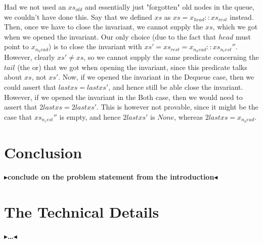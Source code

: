 \documentclass[twoside,11pt,openright]{report}
\newcommand{\todo}[1]{{\color[rgb]{.5,0,0}\textbf{$\blacktriangleright$#1$\blacktriangleleft$}}}
\begin{document}
Had we not used an $xs_{old}$ and essentially just "forgotten" old nodes in the queue, we couldn't have done this. Say that we defined $xs$ as $xs = x_{head} :: xs_{rest}$ instead. Then, once we have to close the invariant, we cannot supply the $xs$, which we got when we opened the invariant. Our only choice (due to the fact that $head$ must point to $x_{n_head}$) is to close the invariant with $xs' = xs_{rest} = x_{n_head} :: xs_{n_rest}''$. However, clearly $xs' \neq xs$, so we cannot supply the same predicate concerning the $tail$ (the or) that we got when opening the invariant, since this predicate talks about $xs$, not $xs'$. Now, if we opened the invariant in the Dequeue case, then we could assert that $last xs = last xs'$, and hence still be able close the invariant. However, if we opened the invariant in the Both case, then we would need to assert that $2last xs = 2last xs'$. This is however not provable, since it might be the case that $xs_{n_rest}''$ is empty, and hence $2last xs'$ is $None$, whereas $2last xs = x_{n_head}$.



\chapter{Conclusion}
\label{ch:conclusion}

\todo{conclude on the problem statement from the introduction}


\cleardoublepage
{}
 



\cleardoublepage
\appendix
\chapter{The Technical Details}

\todo{\dots}
\end{document}
